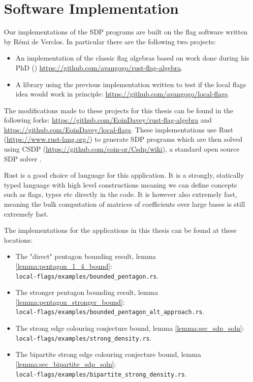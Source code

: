 \chapter{Software Implementation}
\label{app:flag_software}

Our implementations of the SDP programs are built on the flag software written by
Rémi de Verclos. In particular there are the following two projects:
\begin{itemize}
    \item An implementation of the classic flag algebras based on work done during his
        PhD (\cite{deverclosApplicationsLimitsCombinatorial2016})
        \url{https://github.com/avangogo/rust-flag-algebra}.
    \item A library using the previous implementation written to test if the local flags idea
        would work in principle: \url{https://github.com/avangogo/local-flags}.
\end{itemize}

The modifications made to these projects for this thesis can be found in the following forks:
\url{https://github.com/EoinDavey/rust-flag-algebra} and
\url{https://github.com/EoinDavey/local-flags}.
These implementations use Rust (\url{https://www.rust-lang.org/}) to generate SDP programs which are
then solved using CSDP (\url{https://github.com/coin-or/Csdp/wiki}),
a standard open source SDP solver
\cite{borchersCSDPLibrarySemidefinite1999}.

\begin{note}
    Rust is a good choice of language for this application. It is a strongly, statically typed
    language with high level constructions meaning we can define concepts such as flags, types
    etc directly in the code. It is however also extremely fast, meaning the bulk computation
    of matrices of coefficients over large bases is still extremely fast.
\end{note}

The implementations for the applications in this thesis can be found at these locations:
\begin{itemize}
    \item The "direct" pentagon bounding result, lemma
        \ref{lemma:pentagon_1_4_bound}:\\
        \verb|local-flags/examples/bounded_pentagon.rs|.
    \item The stronger pentagon bounding result, lemma
        \ref{lemma:pentagon_stronger_bound}:\\
        \verb|local-flags/examples/bounded_pentagon_alt_approach.rs|.
    \item The strong edge colouring conjecture bound, lemma
        \ref{lemma:sec_sdp_soln}:\\
        \verb|local-flags/examples/strong_density.rs|.
    \item The bipartite strong edge colouring conjecture bound, lemma
        \ref{lemma:sec_bipartite_sdp_soln}:\\
        \verb|local-flags/examples/bipartite_strong_density.rs|.
\end{itemize}

